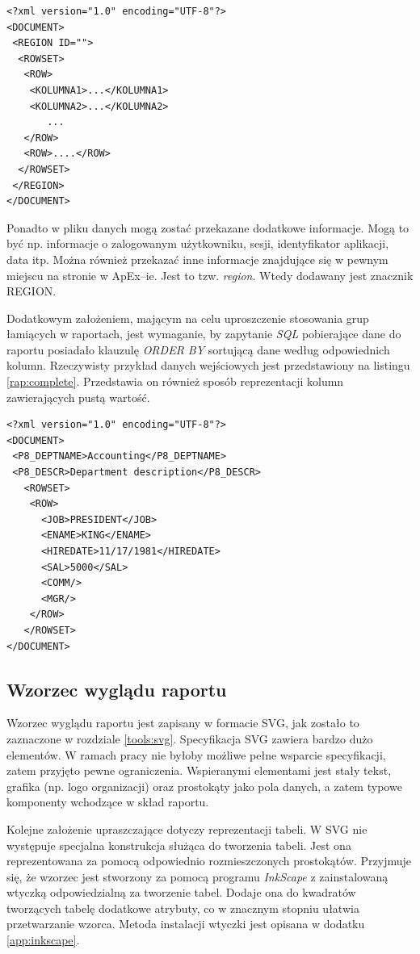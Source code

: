 \documentclass[11pt,a4paper]{article}
\begin{document}
\lstset{language=XML}
\begin{lstlisting}[frame=single,caption=Ogólna postać dokumentu XML z danymi pochodzącymi z ApExa,label=rap:apex]
<?xml version="1.0" encoding="UTF-8"?>
<DOCUMENT>
 <REGION ID="">
  <ROWSET>
   <ROW>
    <KOLUMNA1>...</KOLUMNA1>
    <KOLUMNA2>...</KOLUMNA2>
       ...	
   </ROW>
   <ROW>....</ROW>
  </ROWSET>
 </REGION>
</DOCUMENT>
\end{lstlisting}

Ponadto w pliku danych mogą zostać przekazane dodatkowe informacje. Mogą to być np. informacje o zalogowanym użytkowniku, sesji, identyfikator aplikacji, data itp. Można również przekazać inne informacje znajdujące się w pewnym miejscu na stronie w ApEx--ie. Jest to tzw. \emph{region}. Wtedy dodawany jest znacznik REGION. 


Dodatkowym założeniem, mającym na celu uproszczenie stosowania grup łamiących w raportach, jest wymaganie, by zapytanie \emph{SQL} pobierające dane do raportu posiadało klauzulę \emph{ORDER BY} sortującą dane według odpowiednich kolumn. Rzeczywisty przykład danych wejściowych jest przedstawiony na listingu \ref{rap:complete}. Przedstawia on również sposób reprezentacji kolumn zawierających pustą wartość. 

\lstset{language=XML}
\begin{lstlisting}[frame=single,caption=Przykładowe dane,label=rap:complete]
<?xml version="1.0" encoding="UTF-8"?>
<DOCUMENT>
 <P8_DEPTNAME>Accounting</P8_DEPTNAME>
 <P8_DESCR>Department description</P8_DESCR>
   <ROWSET>
    <ROW>
      <JOB>PRESIDENT</JOB>
      <ENAME>KING</ENAME>
      <HIREDATE>11/17/1981</HIREDATE>
      <SAL>5000</SAL>
      <COMM/>
      <MGR/>
    </ROW>
   </ROWSET>
</DOCUMENT>
\end{lstlisting}

\subsection{Wzorzec wyglądu raportu} \label{solution:layout}
Wzorzec wyglądu raportu jest zapisany w formacie SVG, jak zostało to zaznaczone w rozdziale \ref{tools:svg}. Specyfikacja SVG zawiera bardzo dużo elementów. W ramach pracy nie byłoby możliwe pełne wsparcie specyfikacji, zatem przyjęto pewne ograniczenia. Wspieranymi elementami jest stały tekst, grafika (np. logo organizacji) oraz prostokąty jako pola danych, a zatem typowe komponenty wchodzące w skład raportu.

Kolejne założenie upraszczające dotyczy reprezentacji tabeli. W SVG nie występuje specjalna konstrukcja służąca do tworzenia tabeli. Jest ona reprezentowana za pomocą odpowiednio rozmieszczonych prostokątów. Przyjmuje się, że wzorzec jest stworzony za pomocą programu \emph{InkScape} z zainstalowaną wtyczką odpowiedzialną za tworzenie tabel. Dodaje ona do kwadratów tworzących tabelę dodatkowe atrybuty, co w znacznym stopniu ułatwia przetwarzanie wzorca. Metoda instalacji wtyczki jest opisana w dodatku \ref{app:inkscape}.
\end{document}
